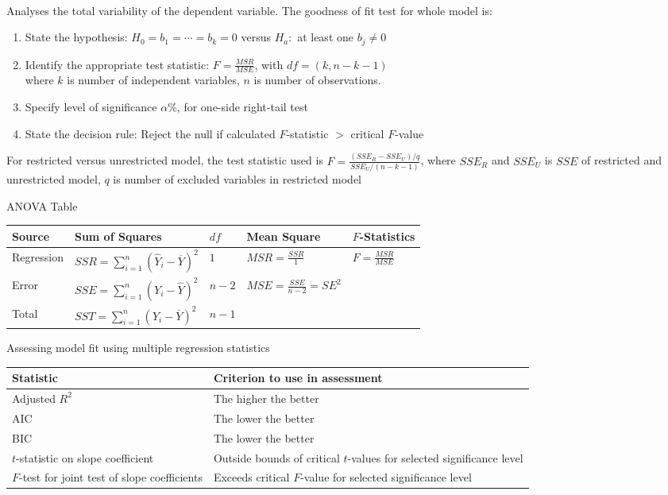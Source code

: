 \begin{definition} \\
Analyses the total variability of the dependent variable. The goodness of fit test for whole model is:
\begin{enumerate}[label=\arabic*.]
\setlength{\itemsep}{0pt}
\item State the hypothesis: $H_0 = b_1 = \cdots = b_k = 0$ versus $H_a:$ at least one $b_j \neq 0$
\item Identify the appropriate test statistic: $F = \frac{MSR}{MSE}$, with $df = (k, n-k-1)$\\
where $k$ is number of independent variables, $n$ is number of observations.
\item Specify level of significance $\alpha \%$, for one-side right-tail test
\item State the decision rule: Reject the null if calculated $F$-statistic $>$ critical $F$-value
\end{enumerate}
For restricted versus unrestricted model, the test statistic used is $F = \frac{(SSE_R - SSE_U)/q}{SSE_U/(n-k-1)}$, where $SSE_R$ and $SSE_U$ is $SSE$ of restricted and unrestricted model, $q$ is number of excluded variables in restricted model
\end{definition}

\begin{flushleft}
ANOVA Table
\begin{tabularx}{\textwidth}{p{5em}|p{10em}|p{3em}|p{10em}|X}
\hline
\rowcolor{gray!30}
Source & Sum of Squares & $df$ & Mean Square & $F$-Statistics \\
\hline
Regression & $SSR = \sum\limits_{i=1}^n (\hat{Y}_i - \overline{Y})^2$ & $1$ & $MSR = \frac{SSR}{1}$ & $F = \frac{MSR}{MSE}$\\
Error & $SSE = \sum\limits_{i=1}^n (Y_i - \hat{Y})^2$ & $n-2$ & $MSE = \frac{SSE}{n-2} = SE^2$ & \\
Total & $SST = \sum\limits_{i=1}^n (Y_i - \overline{Y})^2$ & $n-1$ & & \\
\hline
\end{tabularx}
\end{flushleft}

\begin{flushleft}
Assessing model fit using multiple regression statistics
\begin{tabularx}{\textwidth}{p{18em}|X}
\hline
\rowcolor{gray!30}
Statistic & Criterion to use in assessment \\
\hline
Adjusted $R^2$ & The higher the better \\
AIC & The lower the better \\
BIC & The lower the better \\
$t$-statistic on slope coefficient & Outside bounds of critical $t$-values for selected significance level\\
$F$-test for joint test of slope coefficients & Exceeds critical $F$-value for selected significance level\\
\hline
\end{tabularx}
\end{flushleft}

